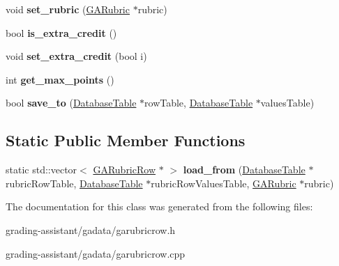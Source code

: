 \begin{DoxyCompactItemize}
\item 
\mbox{\label{class_g_a_rubric_row_ac3120499d72e7378caf58237657987ed}} 
void {\bfseries set\+\_\+rubric} (\hyperlink{class_g_a_rubric}{G\+A\+Rubric} $\ast$rubric)
\item 
\mbox{\label{class_g_a_rubric_row_a6b1b4ee474677157f1d721a342dbeb7f}} 
bool {\bfseries is\+\_\+extra\+\_\+credit} ()
\item 
\mbox{\label{class_g_a_rubric_row_aa290261871c0a8cdfa049e32cf71b417}} 
void {\bfseries set\+\_\+extra\+\_\+credit} (bool i)
\item 
\mbox{\label{class_g_a_rubric_row_aa87770410aefc60063d23bcf979be2ce}} 
int {\bfseries get\+\_\+max\+\_\+points} ()
\item 
\mbox{\label{class_g_a_rubric_row_af28dbffb73143f0acdde87cccff10acd}} 
bool {\bfseries save\+\_\+to} (\hyperlink{class_database_table}{Database\+Table} $\ast$row\+Table, \hyperlink{class_database_table}{Database\+Table} $\ast$values\+Table)
\end{DoxyCompactItemize}
\subsection*{Static Public Member Functions}
\begin{DoxyCompactItemize}
\item 
\mbox{\label{class_g_a_rubric_row_adb6c250cef1347e5811c662677a72e64}} 
static std\+::vector$<$ \hyperlink{class_g_a_rubric_row}{G\+A\+Rubric\+Row} $\ast$ $>$ {\bfseries load\+\_\+from} (\hyperlink{class_database_table}{Database\+Table} $\ast$rubric\+Row\+Table, \hyperlink{class_database_table}{Database\+Table} $\ast$rubric\+Row\+Values\+Table, \hyperlink{class_g_a_rubric}{G\+A\+Rubric} $\ast$rubric)
\end{DoxyCompactItemize}


The documentation for this class was generated from the following files\+:\begin{DoxyCompactItemize}
\item 
grading-\/assistant/gadata/garubricrow.\+h\item 
grading-\/assistant/gadata/garubricrow.\+cpp\end{DoxyCompactItemize}
